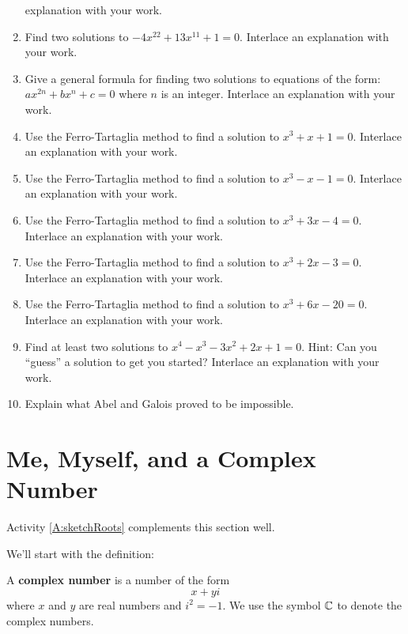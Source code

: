\begin{problems}
\begin{enumerate}
  explanation with your work.
\item Find two solutions to $-4x^{22} + 13x^{11} + 1 = 0$. Interlace
  an explanation with your work.
\item Give a general formula for finding two solutions to equations of
  the form: $ax^{2n} + bx^{n} + c = 0$ where $n$ is an
  integer. Interlace an explanation with your work.
\item Use the Ferro-Tartaglia method to find a solution to $x^3+x+1 =
  0$. Interlace an explanation with your work.
\item Use the Ferro-Tartaglia method to find a solution to $x^3-x-1 =
  0$. Interlace an explanation with your work.
\item Use the Ferro-Tartaglia method to find a solution to $x^3+3x-4 =
  0$. Interlace an explanation with your work.
\item Use the Ferro-Tartaglia method to find a solution to $x^3+2x-3 =
  0$. Interlace an explanation with your work.
\item Use the Ferro-Tartaglia method to find a solution to $x^3+6x-20 =
  0$. Interlace an explanation with your work.
\item Find at least two solutions to $x^4-x^3-3x^2+2x+1 =0$. Hint: Can
  you ``guess'' a solution to get you started?  Interlace an
  explanation with your work.
\item Explain what Abel and Galois proved to be impossible.
\end{enumerate}
\end{problems}





\section{Me, Myself, and a Complex Number}

\begin{activitynote}
Activity \ref{A:sketchRoots} complements this section well.  %
\end{activitynote}


We'll start with the definition:

\begin{definition} 
A \textbf{complex number} is a
number of the form
\[
x + yi
\]
where $x$ and $y$ are real numbers and $i^2 = -1$. We use the symbol $\mathbb C$ to denote the complex numbers.
\end{definition}

